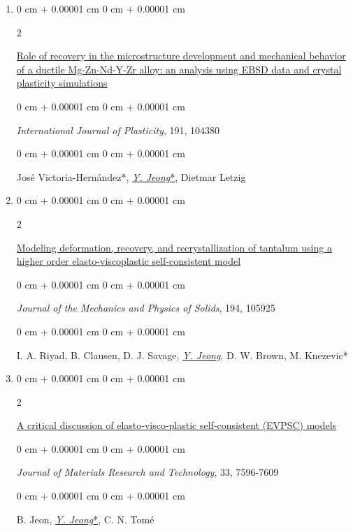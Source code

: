 \documentclass[10pt, letterpaper]{article}
\newenvironment{onecolentry}{
    \begin{adjustwidth}{
        0 cm + 0.00001 cm
    }{
        0 cm + 0.00001 cm
    }
}{
    \end{adjustwidth}
} %
\newenvironment{twocolentry}[2][]{
    \onecolentry
    \def\secondColumn{#2}
    \setcolumnwidth{\fill, 4.5 cm}
    \begin{paracol}{2}
}{
    \switchcolumn \raggedleft \secondColumn
    \end{paracol}
    \endonecolentry
} %
\begin{document}
\begin{enumerate}
        \item
          \begin{twocolentry}{2025}
            \href{https://doi.org/10.1016/j.ijplas.2025.104380}{Role of recovery in the microstructure development and mechanical behavior of a ductile Mg-Zn-Nd-Y-Zr alloy: an analysis using EBSD data and crystal plasticity simulations}
        \end{twocolentry}
        \begin{onecolentry}
            {\it International Journal of Plasticity}, 191, 104380
        \end{onecolentry}
        \begin{onecolentry}
            José Victoria-Hernández*, {\underline{\textit{Y. Jeong}*}}, Dietmar Letzig
        \end{onecolentry}
        \vspace{0.10 cm}


        \item
        \begin{twocolentry}{2025}
            \href{https://doi.org/10.1016/j.jmps.2024.105925}{Modeling deformation, recovery, and recrystallization of tantalum using a higher order elasto-viscoplastic self-consistent model}
        \end{twocolentry}
        \begin{onecolentry}
            {\it Journal of the Mechanics and Physics of Solids}, 194, 105925
        \end{onecolentry}
        \begin{onecolentry}
            I. A. Riyad, B. Clausen, D. J. Savage, {\underline{\textit{Y. Jeong}}}, D. W. Brown, M. Knezevic*
        \end{onecolentry}
        \vspace{0.10 cm}

        \item
        \begin{twocolentry}{2024}
            \href{https://doi.org/10.1016/j.jmrt.2024.11.043}{A critical discussion of elasto‑visco‑plastic self‑consistent (EVPSC) models}
        \end{twocolentry}
        \begin{onecolentry}
            {\it Journal of Materials Research and Technology}, 33, 7596-7609
        \end{onecolentry}
        \begin{onecolentry}
            B. Jeon, {\underline{\textit{Y. Jeong}*}}, C. N. Tomé
        \end{onecolentry}
        \vspace{0.10 cm}


\end{enumerate}
\end{document}
